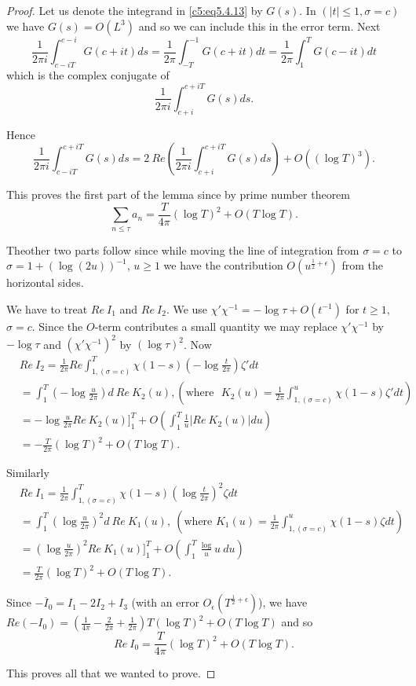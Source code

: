 \begin{proof}
Let us denote the integrand in \eqref{c5:eq5.4.13} by $G(s)$. In
$(|t|\leq 1,\sigma=c)$ we have $G(s)=O(L^{3})$ and so we can include
this in the error term. Next
$$
\frac{1}{2\pi i}\int^{c-i}_{c-iT}G(c+it)ds=\frac{1}{2\pi}\int^{-1}_{-T}G(c+it)dt=\frac{1}{2\pi}\int^{T}_{1}G(c-it)dt
$$
which is the complex conjugate of
$$
\frac{1}{2\pi i}\int^{c+iT}_{c+i}G(s)ds.
$$

Hence 
$$
\frac{1}{2\pi i}\int^{c+iT}_{c-iT}G(s)ds=2\ Re\left(\frac{1}{2\pi
  i}\int^{c+iT}_{c+i}G(s)ds\right)+O((\log T)^{3}).
$$

This proves the first part of the lemma since by prime number theorem
$$
\sum_{n\leq \tau}a_{n}=\frac{T}{4\pi}(\log T)^{2}+O(T\log T).
$$

The\pageoriginale other two parts follow since while moving the line
of integration from $\sigma=c$ to $\sigma=1+(\log(2u))^{-1}$, $u\geq
1$ we have the contribution $O(u^{\frac{1}{2}+\epsilon})$ from the
horizontal sides.

We have to treat $Re\ I_{1}$ and $Re\ I_{2}$. We use
$\chi'\chi^{-1}=-\log \tau+O(t^{-1})$ for $t\geq 1$, $\sigma=c$. Since
the $O$-term contributes a small quantity we may replace
$\chi'\chi^{-1}$ by $-\log \tau$ and $(\chi'\chi^{-1})^{2}$ by
$(\log\tau)^{2}$. Now
\begin{align*}
& Re\ I_{2}=\frac{1}{2\pi}Re\int^{T}_{1,(\sigma=c)}\chi(1-s) \left(-\log
  \frac{t}{2\pi} \right)\zeta'dt\\ 
&= \int^{T}_{1} \left(-\log \frac{u}{2\pi} \right) d\ Re\ K_{2}(u),(\text{where~
  }K_{2}(u)=\frac{1}{2\pi}\int^{u}_{1,(\sigma=c)}\chi(1-s)\zeta'dt)\\
&= -\log
  \frac{u}{2\pi}Re\ K_{2}(u)]^{T}_{1}+O \left(\int^{T}_{1}\frac{1}{u}|Re\ K_{2}(u)|du \right)\\
&= -\frac{T}{2\pi}(\log T)^{2}+O(T\log T).
\end{align*}

Similarly
\begin{align*}
& Re\ I_{1}
=\frac{1}{2\pi}\int^{T}_{1,(\sigma=c)}\chi(1-s) \left(\log\frac{t}{2\pi} \right)^{2}\zeta
dt\\
& = \int^{T}_{1} \left(\log \frac{u}{2\pi} \right)^{2}d\ Re\ K_{1}(u),\ (\text{where~
} K_{1}(u)=\frac{1}{2\pi}\int^{u}_{1,(\sigma=c)}\chi(1-s)\zeta dt)\\
&= \left(\log
\frac{u}{2\pi} \right)^{2}Re\ K_{1}(u)]^{T}_{1}+O\left(\int^{T}_{1}\frac{\log}{u}u\ du\right)\\ 
&= \frac{T}{2\pi}(\log T)^{2}+O(T\log T).
\end{align*}

Since $-\overline{I}_{0}=I_{1}-2I_{2}+I_{3}$ (with an error
$O_{\epsilon}(T^{\frac{1}{2}+\epsilon})$), we have
$Re(-I_{0})= (\frac{1}{4\pi}-\frac{2}{2\pi}+\frac{1}{2\pi})T(\log
T)^{2}+O(T\log T)$ and so
$$
Re\ I_{0}=\frac{T}{4\pi}(\log T)^{2}+O(T\log T).
$$

This proves all that we wanted to prove. 
\end{proof}

